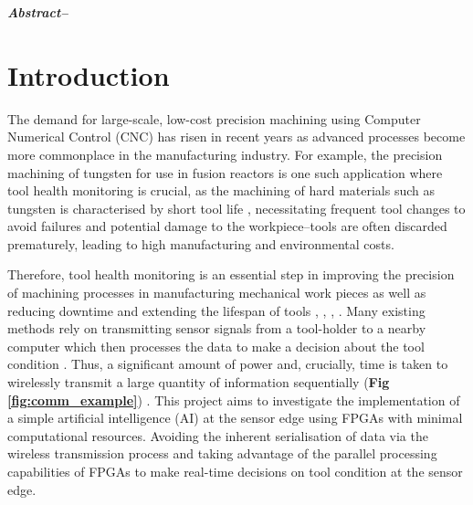 \documentclass[../main.tex]{subfiles}
\begin{document}
\twocolumn

\textit{\textbf{Abstract--}}

\section{Introduction}





The demand for large-scale, low-cost precision machining using Computer Numerical Control (CNC) has risen in recent years as advanced processes become more commonplace in the manufacturing industry. For example, the precision machining of tungsten for use in fusion reactors is one such application where tool health monitoring is crucial, as the machining of hard materials such as tungsten is characterised by short tool life \cite{RN18}, necessitating frequent tool changes to avoid failures and potential damage to the workpiece--tools are often discarded prematurely, leading to high manufacturing and environmental costs.


Therefore, tool health monitoring is an essential step in improving the precision of machining processes in manufacturing mechanical work pieces as well as reducing downtime and extending the lifespan of tools \cite{s22010291}, \cite{9843528}, \cite{9462147}, \cite{RN10}. Many existing methods rely on transmitting sensor signals from a tool-holder to a nearby computer which then processes the data to make a decision about the tool condition \cite{RN13}. 
Thus, a significant amount of power and, crucially, time is taken to wirelessly transmit a large quantity of information sequentially (\textbf{Fig \ref{fig:comm_example}}) \cite{RN1}. %
This project aims to investigate the implementation of a simple artificial intelligence (AI) at the sensor edge using FPGAs with minimal computational resources. Avoiding the inherent serialisation of data via the wireless transmission process and taking advantage of the parallel processing capabilities of FPGAs to make real-time decisions on tool condition at the sensor edge.
\end{document}
